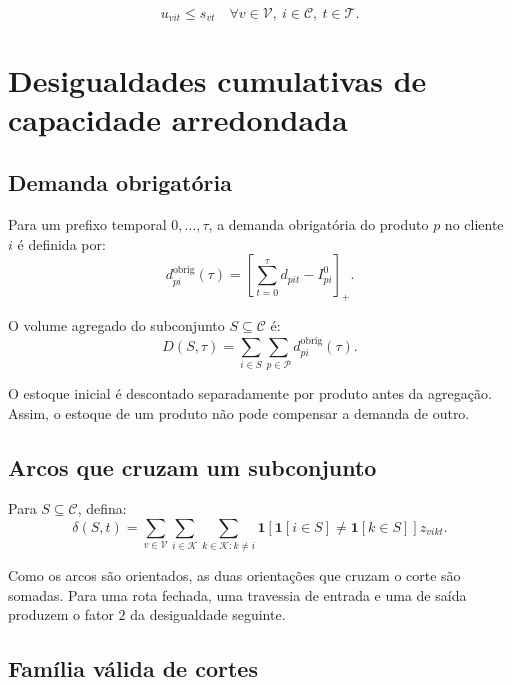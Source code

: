\documentclass[11pt,a4paper]{article}
\newcommand{\set}[1]{\mathcal{#1}}
\newcommand{\pos}[1]{\left[#1\right]_+}
\begin{document}
\begin{equation}
  u_{vit}\le s_{vt}
  \quad \forall v\in\set{V},\ i\in\set{C},\ t\in\set{T}.
  \label{eq:coelho-17}
\end{equation}

\section{Desigualdades cumulativas de capacidade arredondada}
\label{sec:rounded-capacity}

\subsection{Demanda obrigatória}

Para um prefixo temporal $0,\ldots,\tau$, a demanda obrigatória do produto
$p$ no cliente $i$ é definida por:
\begin{equation}
  d^{\mathrm{obrig}}_{pi}(\tau)
  =\pos{\sum_{t=0}^{\tau}d_{pit}-I^0_{pi}}.
  \label{eq:obligatory-demand-product}
\end{equation}

O volume agregado do subconjunto $S\subseteq\set{C}$ é:
\begin{equation}
  D(S,\tau)=\sum_{i\in S}\sum_{p\in\set{P}}
  d^{\mathrm{obrig}}_{pi}(\tau).
  \label{eq:obligatory-demand-subset}
\end{equation}

O estoque inicial é descontado separadamente por produto antes da agregação.
Assim, o estoque de um produto não pode compensar a demanda de outro.

\subsection{Arcos que cruzam um subconjunto}

Para $S\subseteq\set{C}$, defina:
\begin{equation}
  \delta(S,t)=
  \sum_{v\in\set{V}}
  \sum_{i\in\set{K}}\sum_{k\in\set{K}:k\ne i}
  \mathbf{1}\!\left[
    \mathbf{1}[i\in S]\ne\mathbf{1}[k\in S]
  \right]z_{vikt}.
  \label{eq:cut-crossing}
\end{equation}

Como os arcos são orientados, as duas orientações que cruzam o corte são
somadas. Para uma rota fechada, uma travessia de entrada e uma de saída
produzem o fator $2$ da desigualdade seguinte.

\subsection{Família válida de cortes}
\end{document}
